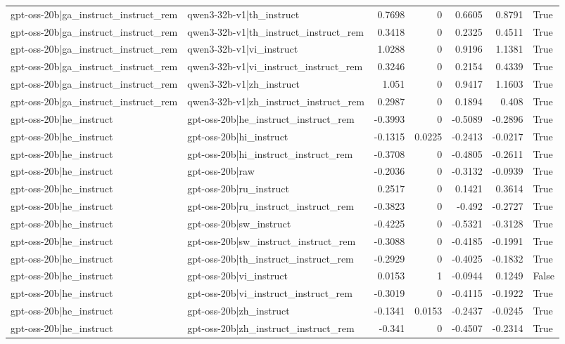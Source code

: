 \begin{table}
\begin{tabular}{l l r r r r l}
gpt-oss-20b|ga_instruct_instruct_rem & qwen3-32b-v1|th_instruct & 0.7698 & 0 & 0.6605 & 0.8791 & True \\
gpt-oss-20b|ga_instruct_instruct_rem & qwen3-32b-v1|th_instruct_instruct_rem & 0.3418 & 0 & 0.2325 & 0.4511 & True \\
gpt-oss-20b|ga_instruct_instruct_rem & qwen3-32b-v1|vi_instruct & 1.0288 & 0 & 0.9196 & 1.1381 & True \\
gpt-oss-20b|ga_instruct_instruct_rem & qwen3-32b-v1|vi_instruct_instruct_rem & 0.3246 & 0 & 0.2154 & 0.4339 & True \\
gpt-oss-20b|ga_instruct_instruct_rem & qwen3-32b-v1|zh_instruct & 1.051 & 0 & 0.9417 & 1.1603 & True \\
gpt-oss-20b|ga_instruct_instruct_rem & qwen3-32b-v1|zh_instruct_instruct_rem & 0.2987 & 0 & 0.1894 & 0.408 & True \\
gpt-oss-20b|he_instruct & gpt-oss-20b|he_instruct_instruct_rem & -0.3993 & 0 & -0.5089 & -0.2896 & True \\
gpt-oss-20b|he_instruct & gpt-oss-20b|hi_instruct & -0.1315 & 0.0225 & -0.2413 & -0.0217 & True \\
gpt-oss-20b|he_instruct & gpt-oss-20b|hi_instruct_instruct_rem & -0.3708 & 0 & -0.4805 & -0.2611 & True \\
gpt-oss-20b|he_instruct & gpt-oss-20b|raw & -0.2036 & 0 & -0.3132 & -0.0939 & True \\
gpt-oss-20b|he_instruct & gpt-oss-20b|ru_instruct & 0.2517 & 0 & 0.1421 & 0.3614 & True \\
gpt-oss-20b|he_instruct & gpt-oss-20b|ru_instruct_instruct_rem & -0.3823 & 0 & -0.492 & -0.2727 & True \\
gpt-oss-20b|he_instruct & gpt-oss-20b|sw_instruct & -0.4225 & 0 & -0.5321 & -0.3128 & True \\
gpt-oss-20b|he_instruct & gpt-oss-20b|sw_instruct_instruct_rem & -0.3088 & 0 & -0.4185 & -0.1991 & True \\
gpt-oss-20b|he_instruct & gpt-oss-20b|th_instruct_instruct_rem & -0.2929 & 0 & -0.4025 & -0.1832 & True \\
gpt-oss-20b|he_instruct & gpt-oss-20b|vi_instruct & 0.0153 & 1 & -0.0944 & 0.1249 & False \\
gpt-oss-20b|he_instruct & gpt-oss-20b|vi_instruct_instruct_rem & -0.3019 & 0 & -0.4115 & -0.1922 & True \\
gpt-oss-20b|he_instruct & gpt-oss-20b|zh_instruct & -0.1341 & 0.0153 & -0.2437 & -0.0245 & True \\
gpt-oss-20b|he_instruct & gpt-oss-20b|zh_instruct_instruct_rem & -0.341 & 0 & -0.4507 & -0.2314 & True \\

\end{tabular}
\end{table}
